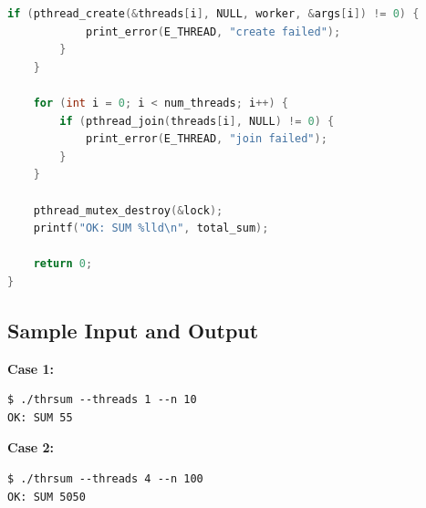 \begin{lstlisting}[language=C, caption={thrsum.c}]
        if (pthread_create(&threads[i], NULL, worker, &args[i]) != 0) {
            print_error(E_THREAD, "create failed");
        }
    }

    for (int i = 0; i < num_threads; i++) {
        if (pthread_join(threads[i], NULL) != 0) {
            print_error(E_THREAD, "join failed");
        }
    }

    pthread_mutex_destroy(&lock);
    printf("OK: SUM %lld\n", total_sum);

    return 0;
}
\end{lstlisting}

\subsection{Sample Input and Output}

\textbf{Case 1:}
\begin{verbatim}
$ ./thrsum --threads 1 --n 10
OK: SUM 55
\end{verbatim}

\textbf{Case 2:}
\begin{verbatim}
$ ./thrsum --threads 4 --n 100
OK: SUM 5050
\end{verbatim}